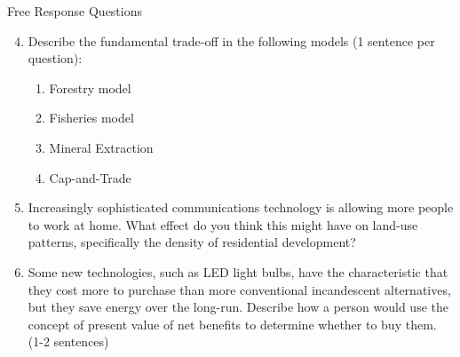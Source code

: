 \documentclass[11pt]{article}
\newcommand{\answer}[1]{\iftoggle{INCLUDEANSWERS}{{\color{violet!70!white}\textbf{Solution:} #1}}{} }
\newcommand{\points}[1]{\iftoggle{INCLUDEPOINTS}{{\color{blue!70!white}(#1 pts.)}}{}}
\begin{document}
\vspace*{5mm}
Free Response Questions

\begin{enumerate}
  \setcounter{enumi}{3}
  \item \points{16} Describe the fundamental trade-off in the following models (1 sentence per question):
  \begin{enumerate}
    \item Forestry model
    \item Fisheries model
    \item Mineral Extraction
    \item Cap-and-Trade
  \end{enumerate}

  \answer{
    \begin{enumerate}
      \item Letting the tree grow (increase in benefits) vs. having to wait for profits / discounting (decrease in benefits)
      \item Marginal benefits of fishing more vs. marginal cost of fishing more
      \item Extraction today vs. extraction tomorrow. Balance marginal net benefits between periods
      \item Balance marginal abatement costs between the two firms
    \end{enumerate}
  }

  \item \points{7} Increasingly sophisticated communications technology is allowing more people to work at home. What effect do you think this might have on land-use patterns, specifically the density of residential development?
  
  \answer{The bid-rent function will become flatter as being closer to the city center is relatively less valuable. That means more workers move into the suburbs.}

  \item \points{7} Some new technologies, such as LED light bulbs, have the characteristic that they cost more to purchase than more conventional incandescent alternatives, but they save energy over the long-run. Describe how a person would use the concept of present value of net benefits to determine whether to buy them. (1-2 sentences)
  
  \answer{A person would Determine the present value of costs today for each lightbulb, the cost of the light bulb and the present value of future costs of electricity. Whichever one is cheaper in terms of present value will be the one purchased. I want the answer to discuss that a balance between high costs today and future benefits (i.e. they understand inter-temporal tradeoffs)}
  

\end{enumerate}
\end{document}
